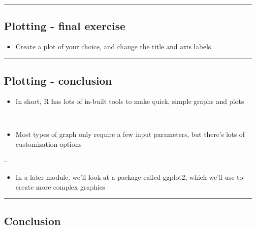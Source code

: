 \documentclass[]{article}
\providecommand{\tightlist}{%
  \setlength{\itemsep}{0pt}\setlength{\parskip}{0pt}}
\begin{document}
\begin{center}\rule{0.5\linewidth}{\linethickness}\end{center}

\hypertarget{plotting---final-exercise}{%
\subsection{Plotting - final exercise}\label{plotting---final-exercise}}

\begin{itemize}
\tightlist
\item
  Create a plot of your choice, and change the title and axis labels.
\end{itemize}

\begin{center}\rule{0.5\linewidth}{\linethickness}\end{center}

\hypertarget{plotting---conclusion}{%
\subsection{Plotting - conclusion}\label{plotting---conclusion}}

\begin{itemize}
\tightlist
\item
  In short, R has lots of in-built tools to make quick, simple graphs
  and plots
\end{itemize}

--

\begin{itemize}
\tightlist
\item
  Most types of graph only require a few input parameters, but there's
  lots of customization options
\end{itemize}

--

\begin{itemize}
\tightlist
\item
  In a later module, we'll look at a package called ggplot2, which we'll
  use to create more complex graphics
\end{itemize}

\begin{center}\rule{0.5\linewidth}{\linethickness}\end{center}

\hypertarget{conclusion}{%
\subsection{Conclusion}\label{conclusion}}
\end{document}
